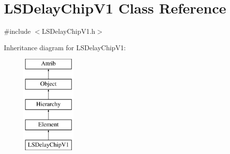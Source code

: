 \hypertarget{classLSDelayChipV1}{}\section{L\+S\+Delay\+Chip\+V1 Class Reference}
\label{classLSDelayChipV1}


{\ttfamily \#include $<$L\+S\+Delay\+Chip\+V1.\+h$>$}

Inheritance diagram for L\+S\+Delay\+Chip\+V1\+:\begin{figure}[H]
\begin{center}
\leavevmode
\includegraphics[height=5.000000cm]{classLSDelayChipV1}
\end{center}
\end{figure}
